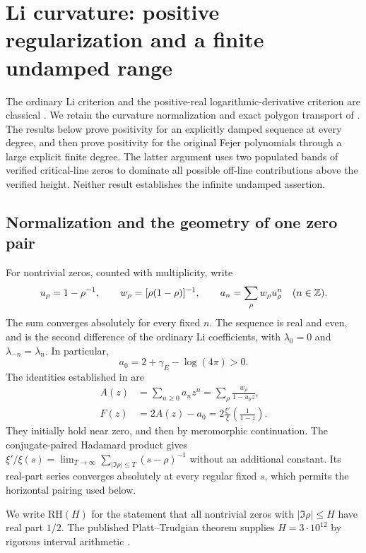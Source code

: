 \documentclass[11pt,a4paper]{article}
\theoremstyle{definition}\newtheorem{definition}[theorem]{Definition}
\theoremstyle{remark}\newtheorem{remark}[theorem]{Remark}
\numberwithin{equation}{section}
\begin{document}
\section{Li curvature: positive regularization and a finite undamped range}
\label{r5l:section}

The ordinary Li criterion and the positive-real logarithmic-derivative
criterion are classical \cite{Lagarias}.  We retain the curvature
normalization and exact polygon transport of \cite{TransferZeta}.
The results below prove positivity for an explicitly damped sequence
at every degree, and then prove positivity for the original Fejer
polynomials through a large explicit finite degree.  The latter
argument uses two populated bands of verified critical-line zeros
to dominate all possible off-line contributions above the verified
height.  Neither result establishes the infinite undamped assertion.

\subsection{Normalization and the geometry of one zero pair}

For nontrivial zeros, counted with multiplicity, write
\begin{equation}\label{r5l:notation}
 u_\rho=1-\rho^{-1},\qquad
 w_\rho=[\rho(1-\rho)]^{-1},\qquad
 a_n=\sum_\rho w_\rho u_\rho^n\quad(n\in\mathbb Z).
\end{equation}
The sum converges absolutely for every fixed $n$.  The sequence is
real and even, and is the second difference of the ordinary Li
coefficients, with $\lambda_0=0$ and $\lambda_{-n}=\lambda_n$.
In particular,
\[
 a_0=2+\gamma_E-\log(4\pi)>0.
\]
The identities established in \cite{TransferZeta} are
\begin{align}
 A(z)&=\sum_{n\ge0}a_nz^n
     =\sum_\rho\frac{w_\rho}{1-u_\rho z},\label{r5l:Agerm}\\
 F(z)&=2A(z)-a_0
     =2\frac{\xi'}{\xi}\left(\frac1{1-z}\right).
       \label{r5l:Fgerm}
\end{align}
They initially hold near zero, and then by meromorphic continuation.
The conjugate-paired Hadamard product gives
$\xi'/\xi(s)=\lim_{T\to\infty}\sum_{|\Im\rho|\le T}(s-\rho)^{-1}$
without an additional constant.  Its real-part series converges
absolutely at every regular fixed $s$, which permits the horizontal
pairing used below.

We write $\mathrm{RH}(H)$ for the statement that all nontrivial zeros
with $|\Im\rho|\le H$ have real part $1/2$.  The published
Platt--Trudgian theorem supplies $H=3\cdot10^{12}$ by rigorous
interval arithmetic \cite{PlattTrudgian}.
\end{document}
